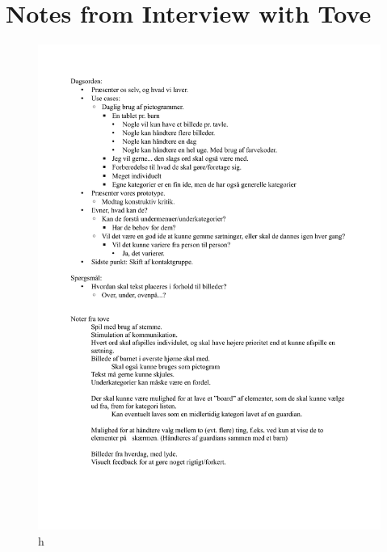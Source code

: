 \chapter{Notes from Interview with Tove}
\label{appendice:notater_fra_tove}
\begin{figure}[htbp]
	\centering
		\includegraphics[width=\textwidth]{input/appendices/notater_fra_tove.pdf}
	\caption{h}
	\label{fig:notater_fra_tove}
\end{figure}
